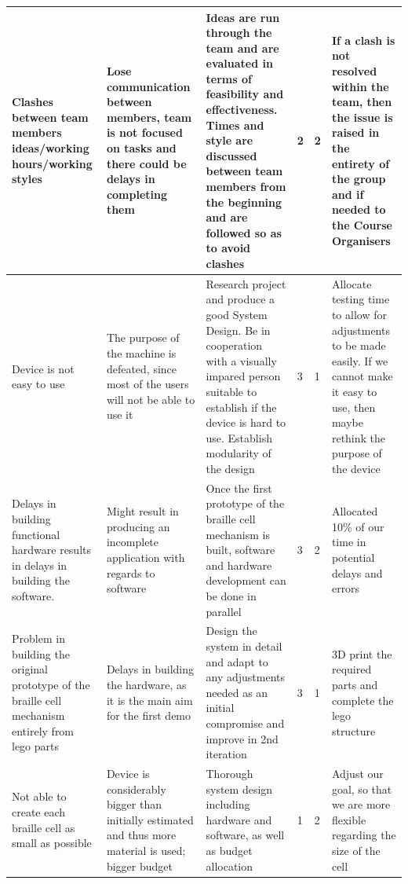 \documentclass{article}
\begin{document}
\begin{table}[h]
\begin{center}
\begin{small}
\begin{tabular}{|p{3cm}|p{3cm}|p{3cm}|p{1cm}|p{1.2cm}|p{3cm}|}
Clashes between team members ideas/working hours/working styles                                   & Lose communication between members, team is not focused on tasks and there could be delays in completing them & Ideas are run through the team and are evaluated in terms of feasibility and effectiveness. Times and style are discussed between team members from the beginning and are followed so as to avoid clashes & 2        & 2          & If a clash is not resolved within the team, then the issue is raised in the entirety of the group and if needed to the Course Organisers          \\ \hline
Device is not easy to use                                                                         & The purpose of the machine is defeated, since most of the users will not be able to use it                      & Research project and produce a good System Design. Be in cooperation with a visually impared person suitable to establish if the device is hard to use. Establish modularity of the design                & 3        & 1          & Allocate testing time to allow for adjustments to be made easily. If we cannot make it easy to use, then maybe rethink the purpose of the device \\ \hline
Delays in building functional hardware results in delays in building the software.                & Might result in producing an incomplete application with regards to software                                    & Once the first prototype of the braille cell mechanism is built, software and hardware development can be done in parallel                                                                                & 3        & 2          & Allocated 10\% of our time in potential delays and errors                                                                                         \\ \hline
Problem in building the original prototype of the braille cell mechanism entirely from lego parts & Delays in building the hardware, as it is the main aim for the first demo                                       & Design the system in detail and adapt to any adjustments needed as an initial compromise and improve in 2nd iteration                                                                                     & 3        & 1          & 3D print the required parts and complete the lego structure                                                                                       \\ \hline
Not able to create each braille cell as small as possible                                         & Device is considerably bigger than initially estimated and thus more material is used; bigger budget            & Thorough system design including hardware and software, as well as budget allocation                                                                                                                      & 1        & 2          & Adjust our goal, so that we are more flexible regarding the size of the cell                                                                      \\ \hline

\end{tabular}
\end{small}
\end{center}
\end{table}
\end{document}
